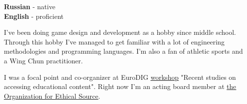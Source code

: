 \documentclass[9pt]{developercv} %
\begin{document}
\begin{minipage}[t]{0.3\textwidth}
	\vspace{-\baselineskip} %

	
	\textbf{Russian} - native\\
	\textbf{English} - proficient\\
\end{minipage}
\hfill
\begin{minipage}[t]{0.3\textwidth}
	\vspace{-\baselineskip} %
	
	
	{I've been doing game design and development as a hobby since middle school.} 
	{Through this hobby I've managed to get familiar with a lot of engineering methodologies and programming languages.}
	{I'm also a fan of athletic sports and a Wing Chun practitioner.}
\end{minipage}
\hfill
\begin{minipage}[t]{0.3\textwidth}
	\vspace{-\baselineskip} %
	
	
	{I was a focal point and co-organizer at EuroDIG \href{https://eurodigwiki.org/wiki/Recent_studies_on_accessing_educational_content_%E2%80%93_WS_11_2021}{\underline{workshop}} "Recent studies on accessing educational content".}
	{Right now I'm an acting board member at \underline{\href{https://ethicalsource.dev/governance/}{the Organization for Ethical Source}}.}
\end{minipage}

\end{document}
